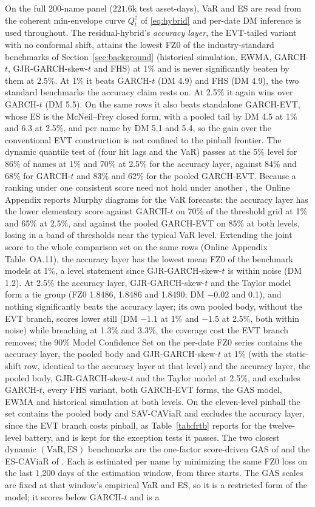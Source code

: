 \documentclass[11pt]{article}
\newcommand{\VaR}{\mathrm{VaR}}
\newcommand{\ES}{\mathrm{ES}}
\theoremstyle{remark}
\begin{document}
On the full 200-name panel ($221.6$k test asset-days), VaR and ES are read from the coherent min-envelope curve $Q^{z}_t$ of \eqref{eq:hybrid} and per-date DM inference is used throughout. The residual-hybrid's \emph{accuracy layer}, the EVT-tailed variant with no conformal shift, attains the lowest FZ0 of the industry-standard benchmarks of Section~\ref{sec:background} (historical simulation, EWMA, GARCH-$t$, GJR-GARCH-skew-$t$ and FHS) at 1\% and is never significantly beaten by them at 2.5\%. At 1\% it beats GARCH-$t$ (DM 4.9) and FHS (DM 4.9), the two standard benchmarks the accuracy claim rests on. At 2.5\% it again wins over GARCH-$t$ (DM 5.5). On the same rows it also beats standalone GARCH-EVT, whose ES is the McNeil--Frey closed form, with a pooled tail by DM 4.5 at 1\% and 6.3 at 2.5\%, and per name by DM 5.1 and 5.4, so the gain over the conventional EVT construction is not confined to the pinball frontier. The dynamic quantile test of \citet{engle2004caviar} (four hit lags and the VaR) passes at the 5\% level for 86\% of names at 1\% and 70\% at 2.5\% for the accuracy layer, against 84\% and 68\% for GARCH-$t$ and 83\% and 62\% for the pooled GARCH-EVT. Because a ranking under one consistent score need not hold under another \citep{patton2020}, the Online Appendix reports Murphy diagrams \citep{ehm2016} for the VaR forecasts: the accuracy layer has the lower elementary score against GARCH-$t$ on 70\% of the threshold grid at 1\% and 65\% at 2.5\%, and against the pooled GARCH-EVT on 85\% at both levels, losing in a band of thresholds near the typical VaR level. Extending the joint score to the whole comparison set on the same rows (Online Appendix Table~OA.11), the accuracy layer has the lowest mean FZ0 of the benchmark models at 1\%, a level statement since GJR-GARCH-skew-$t$ is within noise (DM 1.2). At 2.5\% the accuracy layer, GJR-GARCH-skew-$t$ and the Taylor model form a tie group (FZ0 1.8486, 1.8486 and 1.8490; DM $-0.02$ and 0.1), and nothing significantly beats the accuracy layer; its own pooled body, without the EVT branch, scores lower still (DM $-1.1$ at 1\% and $-1.5$ at 2.5\%, both within noise) while breaching at 1.3\% and 3.3\%, the coverage cost the EVT branch removes; the 90\% Model Confidence Set on the per-date FZ0 series contains the accuracy layer, the pooled body and GJR-GARCH-skew-$t$ at 1\% (with the static-shift row, identical to the accuracy layer at that level) and the accuracy layer, the pooled body, GJR-GARCH-skew-$t$ and the Taylor model at 2.5\%, and excludes GARCH-$t$, every FHS variant, both GARCH-EVT forms, the GAS model, EWMA and historical simulation at both levels. On the eleven-level pinball the set contains the pooled body and SAV-CAViaR and excludes the accuracy layer, since the EVT branch costs pinball, as Table~\ref{tab:frtb} reports for the twelve-level battery, and is kept for the exception tests it passes. The two closest dynamic $(\VaR,\ES)$ benchmarks are the one-factor score-driven GAS of \citet{patton2019} and the ES-CAViaR of \citet{taylor2019}. Each is estimated per name by minimizing the same FZ0 loss on the last 1{,}200 days of the estimation window, from three starts. The GAS scales are fixed at that window's empirical VaR and ES, so it is a restricted form of the model; it scores below GARCH-$t$ and is a 
\end{document}
